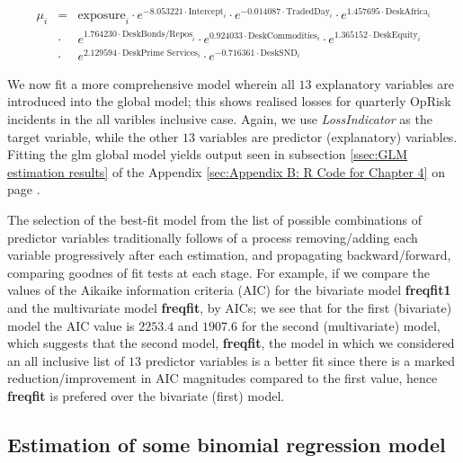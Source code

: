 \documentclass{DissertateUSU}
\begin{document}
\singlespacing

\begin{eqnarray}
\mu_{i}& = &\mbox{exposure}_i\cdot e^{-8.053221\cdot \mbox{Intercept}_i}\cdot e^{-0.014087\cdot \mbox{TradedDay}_i}\cdot e^{1.457695\cdot \mbox{DeskAfrica}_i}\nonumber\\
&\cdot&e^{1.764230\cdot \mbox{DeskBonds/Repos}_i}\cdot e^{0.924033\cdot \mbox{DeskCommodities}_i}\cdot e^{1.365152\cdot \mbox{DeskEquity}_i}\nonumber\\
&\cdot& e^{2.129594\cdot \mbox{DeskPrime Services}_i}\cdot e^{-0.716361\cdot \mbox{DeskSND}_i}
\end{eqnarray} \doublespacing

We now fit a more comprehensive model wherein all \(13\) explanatory
variables are introduced into the global model; this shows realised
losses for quarterly OpRisk incidents in the all varibles inclusive
case. Again, we use \emph{LossIndicator} as the target variable, while
the other \(13\) variables are predictor (explanatory) variables.
Fitting the glm global model yields output seen in subsection
\ref{ssec:GLM estimation results} of the Appendix
\ref{sec:Appendix B: R Code for Chapter 4} on page \pageref{sec:Models}.

The selection of the best-fit model from the list of possible
combinations of predictor variables traditionally follows of a process
removing/adding each variable progressively after each estimation, and
propagating backward/forward, comparing goodnes of fit tests at each
stage. For example, if we compare the values of the Aikaike information
criteria (AIC) for the bivariate model \textbf{freqfit1} and the
multivariate model \textbf{freqfit}, by AICs; we see that for the first
(bivariate) model the AIC value is \(2253.4\) and \(1907.6\) for the
second (multivariate) model, which suggests that the second model,
\textbf{freqfit}, the model in which we considered an all inclusive list
of \(13\) predictor variables is a better fit since there is a marked
reduction/improvement in AIC magnitudes compared to the first value,
hence \textbf{freqfit} is prefered over the bivariate (first) model.

\singlespacing

\doublespacing

\subsection{Estimation of some binomial regression model}
\end{document}
